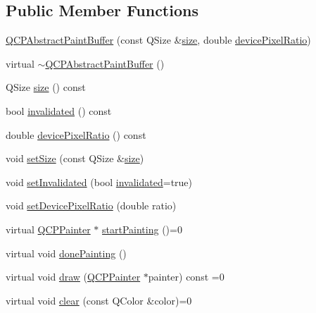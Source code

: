 \subsection*{Public Member Functions}
\begin{DoxyCompactItemize}
\item 
\mbox{\hyperlink{class_q_c_p_abstract_paint_buffer_a3ce532c12f10b81697108835755641e2}{Q\+C\+P\+Abstract\+Paint\+Buffer}} (const Q\+Size \&\mbox{\hyperlink{class_q_c_p_abstract_paint_buffer_a3ea8284e547985c5d263f26a6adfa11f}{size}}, double \mbox{\hyperlink{class_q_c_p_abstract_paint_buffer_aac1b981f8c1744036610ff1a6b9461f9}{device\+Pixel\+Ratio}})
\item 
virtual \mbox{\hyperlink{class_q_c_p_abstract_paint_buffer_a50fbb1265814d019a1707f4cb11e20de}{$\sim$\+Q\+C\+P\+Abstract\+Paint\+Buffer}} ()
\item 
Q\+Size \mbox{\hyperlink{class_q_c_p_abstract_paint_buffer_a3ea8284e547985c5d263f26a6adfa11f}{size}} () const
\item 
bool \mbox{\hyperlink{class_q_c_p_abstract_paint_buffer_a76bf771cda945a6c602cf9b7d365d92b}{invalidated}} () const
\item 
double \mbox{\hyperlink{class_q_c_p_abstract_paint_buffer_aac1b981f8c1744036610ff1a6b9461f9}{device\+Pixel\+Ratio}} () const
\item 
void \mbox{\hyperlink{class_q_c_p_abstract_paint_buffer_a8b68c3cd36533f1a4a23b5ce8cd66f01}{set\+Size}} (const Q\+Size \&\mbox{\hyperlink{class_q_c_p_abstract_paint_buffer_a3ea8284e547985c5d263f26a6adfa11f}{size}})
\item 
void \mbox{\hyperlink{class_q_c_p_abstract_paint_buffer_ae4c7dc70dfc66be2879ce297b2b3d67f}{set\+Invalidated}} (bool \mbox{\hyperlink{class_q_c_p_abstract_paint_buffer_a76bf771cda945a6c602cf9b7d365d92b}{invalidated}}=true)
\item 
void \mbox{\hyperlink{class_q_c_p_abstract_paint_buffer_a555eaad5d5c806420ff35602a1bb68fa}{set\+Device\+Pixel\+Ratio}} (double ratio)
\item 
virtual \mbox{\hyperlink{class_q_c_p_painter}{Q\+C\+P\+Painter}} $\ast$ \mbox{\hyperlink{class_q_c_p_abstract_paint_buffer_a9e9f29b19c033cf02fb96f1a148463f3}{start\+Painting}} ()=0
\item 
virtual void \mbox{\hyperlink{class_q_c_p_abstract_paint_buffer_a41b0dc6e7744f19fae09f8532c207dc1}{done\+Painting}} ()
\item 
virtual void \mbox{\hyperlink{class_q_c_p_abstract_paint_buffer_afb998c7525e3ae37d9d2d46c7aaf461a}{draw}} (\mbox{\hyperlink{class_q_c_p_painter}{Q\+C\+P\+Painter}} $\ast$painter) const =0
\item 
virtual void \mbox{\hyperlink{class_q_c_p_abstract_paint_buffer_a9e253f4541dfc01992b77e8830bd7722}{clear}} (const Q\+Color \&color)=0
\end{DoxyCompactItemize}
